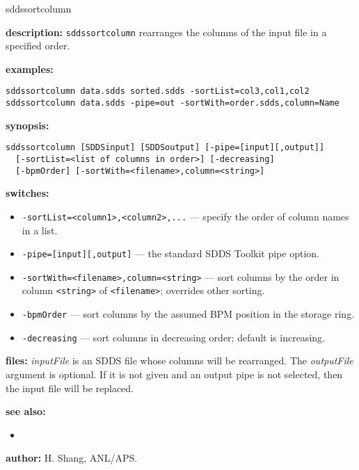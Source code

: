 \begin{sddsprog}{sddssortcolumn}
  \item \textbf{description:}
    \verb|sddssortcolumn| rearranges the columns of the input file in a specified order.
  \item \textbf{examples:}
    \begin{verbatim}
sddssortcolumn data.sdds sorted.sdds -sortList=col3,col1,col2
sddssortcolumn data.sdds -pipe=out -sortWith=order.sdds,column=Name
    \end{verbatim}
  \item \textbf{synopsis:}
    \begin{verbatim}
sddssortcolumn [SDDSinput] [SDDSoutput] [-pipe=[input][,output]]
  [-sortList=<list of columns in order>] [-decreasing]
  [-bpmOrder] [-sortWith=<filename>,column=<string>]
    \end{verbatim}
  \item \textbf{switches:}
    \begin{itemize}
      \item \verb|-sortList=<column1>,<column2>,...| --- specify the order of column names in a list.
      \item \verb|-pipe=[input][,output]| --- the standard SDDS Toolkit pipe option.
      \item \verb|-sortWith=<filename>,column=<string>| --- sort columns by the order in column \verb|<string>| of \verb|<filename>|; overrides other sorting.
      \item \verb|-bpmOrder| --- sort columns by the assumed BPM position in the storage ring.
      \item \verb|-decreasing| --- sort columns in decreasing order; default is increasing.
    \end{itemize}
  \item \textbf{files:}
    \emph{inputFile} is an SDDS file whose columns will be rearranged. The \emph{outputFile} argument is optional. If it is not given and an output pipe is not selected, then the input file will be replaced.
  \item \textbf{see also:}
    \begin{itemize}
      \item {}
    \end{itemize}
  \item \textbf{author:} H. Shang, ANL/APS.
\end{sddsprog}
